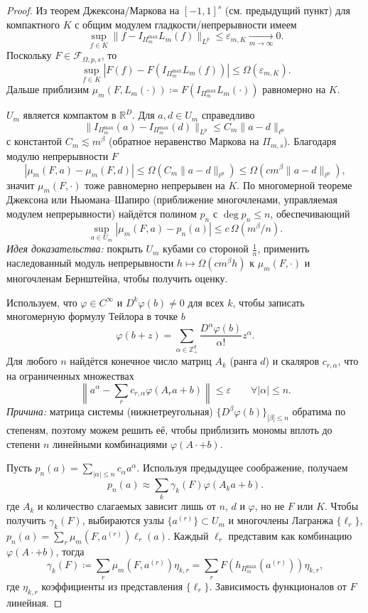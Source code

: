 \documentclass[12pt]{article}
\begin{document}
\begin{proof}
  Из теорем Джексона/Маркова на \([-1, 1]^s\) (см. предыдущий пункт) для компактного \(K\) с общим модулем гладкости/непрерывности имеем
  \[\sup_{f \in K} \|f - I_{\Pi_m^{\max}} L_m(f)\|_{L^p} \le \varepsilon_{m,K} \xrightarrow[m \to \infty]{} 0.\]
  Поскольку \(F \in \mathcal{F}_{\Omega,p,s}\), то
  \[\sup_{f \in K} |F(f) - F(I_{\Pi_m^{\max}} L_m(f))| \le \Omega(\varepsilon_{m,K}).\]
  Дальше приблизим \(\mu_m(F, L_m(\cdot)) \coloneq F(I_{\Pi_m^{\max}} L_m(\cdot))\) равномерно на \(K\).

  \(U_m\) является компактом в \(\mathbb{R}^D\).
  Для \(a, d \in U_m\) справедливо
  \[\|I_{\Pi_m^{\max}}(a) - I_{\Pi_m^{\max}}(d)\|_{L^p} \le C_m \|a - d\|_{\ell^p}\]
  с константой \(C_m \lesssim m^\beta\) (обратное неравенство Маркова на \(\Pi_{m,s}\)).
  Благодаря модулю непрерывности \(F\)
  \[|\mu_m(F,a) - \mu_m(F,d)| \le \Omega(C_m \|a - d\|_{\ell^p}) \le \Omega(c m^\beta \|a - d\|_{\ell^p}),\]
  значит \(\mu_m(F,\cdot)\) тоже равномерно непрерывен на \(K\).
  По многомерной теореме Джексона или Ньюмана--Шапиро (приближение многочленами, управляемая модулем непрерывности) найдётся полином \(p_n\) с \(\operatorname*{deg} p_n \le n\), обеспечивающий
  \[\sup_{a \in U_m} |\mu_m(F,a) - p_n(a)| \le c \, \Omega(m^\beta / n).\]
  \emph{Идея доказательства:} покрыть \(U_m\) кубами со стороной \(\frac{1}{n}\), применить наследованный модуль непрерывности \(h \mapsto \Omega(c m^\beta h)\) к \(\mu_m(F,\cdot)\) и многочленам Бернштейна, чтобы получить оценку.

  Используем, что \(\varphi \in C^\infty\) и \(D^k \varphi(b) \neq 0\) для всех \(k\), чтобы записать многомерную формулу Тейлора в точке \(b\)
  \[\varphi(b + z) = \sum_{\alpha \in \mathbb{Z}_+^d} \frac{D^\alpha \varphi(b)}{\alpha!} z^\alpha.\]
  Для любого \(n\) найдётся конечное число матриц \(A_k\) (ранга \(d\)) и скаляров \(c_{r, \alpha}\), что на ограниченных множествах
  \[\left\| a^\alpha - \sum_{r} c_{r,\alpha} \varphi(A_r a + b) \right\| \le \varepsilon \qquad \forall |\alpha| \leq n.\]
  \emph{Причина:} матрица системы (нижнетреугольная) \(\{D^\beta \varphi(b)\}_{|\beta| \le n}\) обратима по степеням, поэтому можем решить её, чтобы приблизить мономы вплоть до степени \(n\) линейными комбинациями \(\varphi(A \cdot + b)\).

  Пусть \(p_n(a) = \sum_{|\alpha| \leq n} c_\alpha a^\alpha\).
  Используя предыдущее соображение, получаем
  \[p_n(a) \approx \sum_{k} \gamma_k(F) \varphi(A_k a + b).\]
  где \(A_k\) и количество слагаемых зависит лишь от \(n\), \(d\) и \(\varphi\), но не \(F\) или \(K\).
  Чтобы получить \(\gamma_k(F)\), выбираются узлы \(\{a^{(r)}\} \subset U_m\) и многочлены Лагранжа \(\{\ell_r\}\), \(p_n(a) = \sum_r \mu_m(F,a^{(r)}) \ell_r(a)\).
  Каждый \(\ell_r\) представим как комбинацию \(\varphi(A \cdot + b)\), тогда
  \[\gamma_k(F) \coloneq \sum_r \mu_m(F,a^{(r)}) \eta_{k,r} = \sum_r F(h_{\Pi_m^{\max}}(a^{(r)})) \eta_{k,r},\]
  где \(\eta_{k,r}\) коэффициенты из представления \(\{\ell_r\}\). Зависимость функционалов от \(F\) линейная.


\end{proof}
\end{document}
